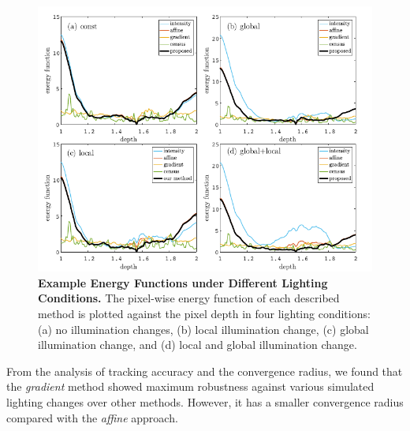 \begin{figure}[t] 
  	\centering
  	\includegraphics[width=0.8\linewidth]{figures/illumination/direct_energy_function.pdf}
	\caption[Example Energy Functions under Different Lighting Conditions]{ \textbf{Example Energy Functions under Different Lighting Conditions.} The pixel-wise energy function of each described method is plotted against the pixel depth in four lighting conditions: (a) no illumination changes, (b) local illumination change, (c) global illumination change, and (d) local and global illumination change. 
	\label{fig:illumination_energyfunc}}
\end{figure} 

From the analysis of tracking accuracy and the convergence radius, we found that the {\em gradient} method showed maximum robustness against various simulated lighting changes over other methods. However, it has a smaller convergence radius compared with the {\em affine} approach. 

